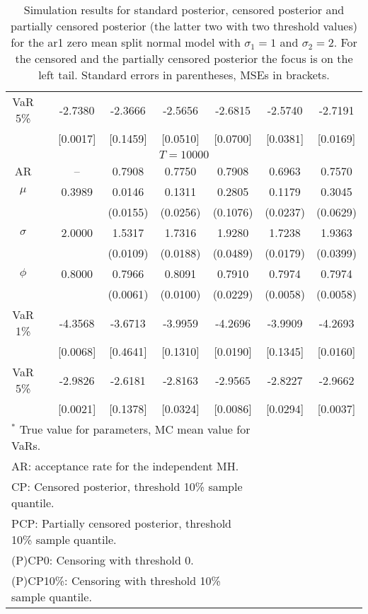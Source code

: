{\begin{table}
\begin{tabular}{cc cccccc}
VaR 5\% && -2.7380 & -2.3666 & -2.5656 & -2.6815 & -2.5740 & -2.7191 \\ 
 && [0.0017] & [0.1459] & [0.0510] & [0.0700] & [0.0381] & [0.0169] \\ 
\hline 
\multicolumn{8}{c}{$T =10000$}  \\ 
\hline 
AR && -- & 0.7908 & 0.7750 & 0.7908 & 0.6963 & 0.7570 \\  
$\mu$&& 0.3989 & 0.0146 & 0.1311 & 0.2805 & 0.1179 & 0.3045 \\ 
&&   & (0.0155) & (0.0256) & (0.1076) & (0.0237) & (0.0629) \\ 
$\sigma$&& 2.0000 & 1.5317 & 1.7316 & 1.9280 & 1.7238 & 1.9363 \\ 
&&   & (0.0109) & (0.0188) & (0.0489) & (0.0179) & (0.0399) \\ 
$\phi$&& 0.8000 & 0.7966 & 0.8091 & 0.7910 & 0.7974 & 0.7974 \\ 
&&   & (0.0061) & (0.0100) & (0.0229) & (0.0058) & (0.0058) \\ 
VaR 1\% && -4.3568 & -3.6713 & -3.9959 & -4.2696 & -3.9909 & -4.2693 \\ 
  && [0.0068] & [0.4641] & [0.1310] & [0.0190] & [0.1345] & [0.0160] \\ 
VaR 5\% && -2.9826 & -2.6181 & -2.8163 & -2.9565 & -2.8227 & -2.9662 \\ 
 && [0.0021] & [0.1378] & [0.0324] & [0.0086] & [0.0294] & [0.0037] \\ 
\hline 
\multicolumn{6}{l}{\footnotesize{$^*$ True value for parameters, MC mean value for VaRs.}}  \\ 
\multicolumn{6}{l}{\footnotesize{AR: acceptance rate for the independent MH.}}  \\ 
\multicolumn{6}{l}{\footnotesize{CP: Censored posterior, threshold 10\% sample quantile.}}  \\ 
\multicolumn{6}{l}{\footnotesize{PCP: Partially censored posterior,  threshold 10\% sample quantile.}} \\ 
\multicolumn{6}{l}{\footnotesize{(P)CP0: Censoring with threshold 0.}} \\ 
\multicolumn{6}{l}{\footnotesize{(P)CP10\%: Censoring with threshold 10\% sample quantile.}}  \\ 
\end{tabular}
 \caption{Simulation results for standard posterior, censored posterior and partially censored posterior (the latter two with two threshold values) for the ar1 zero mean split normal model with $\sigma_{1} = 1$ and $\sigma_{2} = 2$. For the censored and the partially censored posterior the focus is on the left tail. Standard errors in parentheses, MSEs in brackets.} 
\label{tab:ar1_pcp}  
\end{table}
}